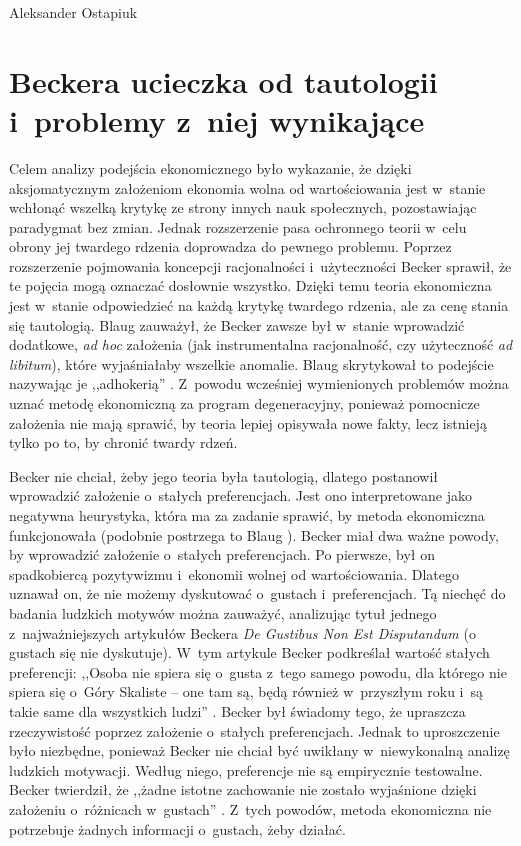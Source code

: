 \begin{artplenv}{Aleksander Ostapiuk}
\section{Beckera ucieczka od tautologii i~problemy z~niej wynikające}
Celem analizy podejścia ekonomicznego było wykazanie, że dzięki aksjomatycznym założeniom ekonomia wolna od wartościowania
jest w~stanie wchłonąć wszelką krytykę ze strony innych nauk społecznych, pozostawiając paradygmat bez zmian. Jednak
rozszerzenie pasa ochronnego teorii w~celu obrony jej twardego rdzenia doprowadza do pewnego problemu.
Poprzez rozszerzenie pojmowania koncepcji racjonalności i~użyteczności Becker sprawił, że te pojęcia mogą oznaczać
dosłownie wszystko. Dzięki temu teoria ekonomiczna jest w~stanie odpowiedzieć na każdą krytykę twardego rdzenia, ale za
cenę stania się tautologią. Blaug zauważył, że Becker zawsze był w~stanie wprowadzić dodatkowe, \textit{ad hoc}
założenia (jak instrumentalna racjonalność, czy użyteczność \textit{ad libitum}), które wyjaśniałaby wszelkie
anomalie. Blaug skrytykował to podejście nazywając je ,,adhokerią''
\parencite[s.~325–326]{blaug_metodologia_1995}.
Z~powodu wcześniej wymienionych problemów można uznać metodę ekonomiczną za program degeneracyjny, ponieważ pomocnicze
założenia nie mają sprawić, by teoria lepiej opisywała nowe fakty, lecz istnieją tylko po to, by chronić twardy rdzeń. 

Becker nie chciał, żeby jego teoria była tautologią, dlatego postanowił wprowadzić założenie o~stałych preferencjach.
Jest ono interpretowane jako negatywna heurystyka, która ma za zadanie sprawić, by metoda ekonomiczna funkcjonowała
(podobnie postrzega to Blaug \parencite*[s.~323–324]{blaug_metodologia_1995}).
Becker miał dwa ważne powody, by
wprowadzić założenie o~stałych preferencjach. Po pierwsze, był on spadkobiercą pozytywizmu i~ekonomii wolnej od
wartościowania. Dlatego uznawał on, że nie możemy dyskutować o~gustach i~preferencjach. Tą niechęć do badania ludzkich
motywów można zauważyć, analizując tytuł jednego z~najważniejszych artykułów Beckera \textit{De Gustibus Non Est
Disputandum} (o gustach się nie dyskutuje). W~tym artykule Becker podkreślał wartość stałych preferencji: ,,Osoba nie
spiera się o~gusta z~tego samego powodu, dla którego nie spiera się o~Góry Skaliste -- one tam są, będą
również w~przyszłym roku i~są takie same dla wszystkich ludzi''
\parencite[s.~76]{becker_gustibus_1977}.
Becker
był świadomy tego, że upraszcza rzeczywistość poprzez założenie o~stałych preferencjach. Jednak to uproszczenie było
niezbędne, ponieważ Becker nie chciał być uwikłany w~niewykonalną analizę ludzkich motywacji. Według niego, preferencje
nie są empirycznie testowalne. Becker twierdził, że ,,żadne istotne zachowanie nie zostało wyjaśnione dzięki
założeniu o~różnicach w~gustach''
\parencite[ s.~89]{becker_gustibus_1977}.
Z~tych powodów, metoda ekonomiczna nie
potrzebuje żadnych informacji o~gustach, żeby działać. 


\end{artplenv}
